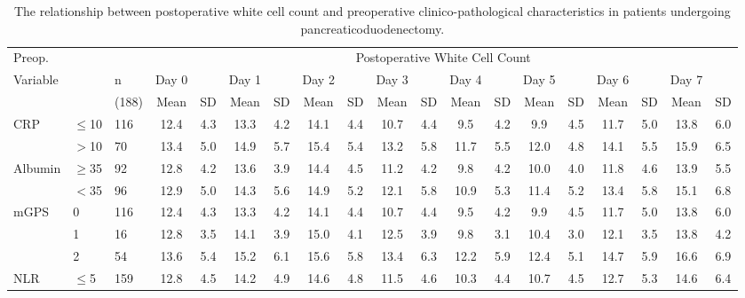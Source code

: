 \begin{sidewaystable}[p]
	\caption{The relationship  between postoperative white cell count and preoperative clinico-pathological characteristics in patients undergoing pancreaticoduodenectomy. }
	\label{table:sirs_wcc}
	\footnotesize
	\centering
	\renewcommand{\arraystretch}{1.2} %
	
	\begin{tabular}{|l ll | cc cc cc cc cc cc cc cc|}
		\hline
		Preop.              &           &       &                             \multicolumn{16}{c|}{Postoperative White Cell Count}                              \\
		Variable            &           & n     & Day 0 &     & Day 1 &     & Day 2 &     & Day 3 &     & Day 4 &     & Day 5 &     & Day 6 &     & Day 7 &  \\
		                    &           & (188) & Mean  & SD  & Mean  & SD  & Mean  & SD  & Mean  & SD  & Mean  & SD  & Mean  & SD  & Mean  & SD  & Mean  & SD  \\ \hline
		CRP                 & $\leq$10  & 116   & 12.4  & 4.3 & 13.3  & 4.2 & 14.1  & 4.4 & 10.7  & 4.4 & 9.5   & 4.2 & 9.9   & 4.5 & 11.7  & 5.0 & 13.8  & 6.0 \\
		                    & $>$10     & 70    & 13.4  & 5.0 & 14.9  & 5.7 & 15.4  & 5.4 & 13.2  & 5.8 & 11.7  & 5.5 & 12.0  & 4.8 & 14.1  & 5.5 & 15.9  & 6.5 \\
		Albumin             & $\geq$35  & 92    & 12.8  & 4.2 & 13.6  & 3.9 & 14.4  & 4.5 & 11.2  & 4.2 & 9.8   & 4.2 & 10.0  & 4.0 & 11.8  & 4.6 & 13.9  & 5.5 \\
		                    & $<$35     & 96    & 12.9  & 5.0 & 14.3  & 5.6 & 14.9  & 5.2 & 12.1  & 5.8 & 10.9  & 5.3 & 11.4  & 5.2 & 13.4  & 5.8 & 15.1  & 6.8 \\
		mGPS                & 0         & 116   & 12.4  & 4.3 & 13.3  & 4.2 & 14.1  & 4.4 & 10.7  & 4.4 & 9.5   & 4.2 & 9.9   & 4.5 & 11.7  & 5.0 & 13.8  & 6.0 \\
		                    & 1         & 16    & 12.8  & 3.5 & 14.1  & 3.9 & 15.0  & 4.1 & 12.5  & 3.9 & 9.8   & 3.1 & 10.4  & 3.0 & 12.1  & 3.5 & 13.8  & 4.2 \\
		                    & 2         & 54    & 13.6  & 5.4 & 15.2  & 6.1 & 15.6  & 5.8 & 13.4  & 6.3 & 12.2  & 5.9 & 12.4  & 5.1 & 14.7  & 5.9 & 16.6  & 6.9 \\
		NLR                 & $\leq$5   & 159   & 12.8  & 4.5 & 14.2  & 4.9 & 14.6  & 4.8 & 11.5  & 4.6 & 10.3  & 4.4 & 10.7  & 4.5 & 12.7  & 5.3 & 14.6  & 6.4 \\

\end{tabular}
\end{sidewaystable}

